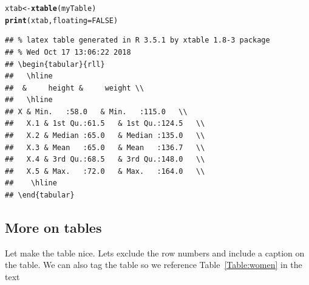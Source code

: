 \documentclass{article}\usepackage[]{graphicx}\usepackage[]{color}
\makeatletter
\newcommand{\hlnum}[1]{\textcolor[rgb]{0.686,0.059,0.569}{#1}}%
\newcommand{\hlstd}[1]{\textcolor[rgb]{0.345,0.345,0.345}{#1}}%
\newcommand{\hlkwb}[1]{\textcolor[rgb]{0.69,0.353,0.396}{#1}}%
\newcommand{\hlkwc}[1]{\textcolor[rgb]{0.333,0.667,0.333}{#1}}%
\newcommand{\hlkwd}[1]{\textcolor[rgb]{0.737,0.353,0.396}{\textbf{#1}}}%
\newenvironment{kframe}{%
 \def\at@end@of@kframe{}%
 \ifinner\ifhmode%
  \def\at@end@of@kframe{\end{minipage}}%
  \begin{minipage}{\columnwidth}%
 \fi\fi%
 \def\FrameCommand##1{\hskip\@totalleftmargin \hskip-\fboxsep
 \colorbox{shadecolor}{##1}\hskip-\fboxsep
     \hskip-\linewidth \hskip-\@totalleftmargin \hskip\columnwidth}%
 \MakeFramed {\advance\hsize-\width
   \@totalleftmargin\z@ \linewidth\hsize
   \@setminipage}}%
 {\par\unskip\endMakeFramed%
 \at@end@of@kframe}
\newenvironment{knitrout}{}{} %
\makeatother
\begin{document}
\begin{knitrout}
\color{fgcolor}\begin{kframe}
\begin{alltt}
\hlstd{xtab}\hlkwb{<-}\hlkwd{xtable}\hlstd{(myTable)}
\hlkwd{print}\hlstd{(xtab,} \hlkwc{floating}\hlstd{=}\hlnum{FALSE}\hlstd{)}
\end{alltt}
\begin{verbatim}
## % latex table generated in R 3.5.1 by xtable 1.8-3 package
## % Wed Oct 17 13:06:22 2018
## \begin{tabular}{rll}
##   \hline
##  &     height &     weight \\ 
##   \hline
## X & Min.   :58.0   & Min.   :115.0   \\ 
##   X.1 & 1st Qu.:61.5   & 1st Qu.:124.5   \\ 
##   X.2 & Median :65.0   & Median :135.0   \\ 
##   X.3 & Mean   :65.0   & Mean   :136.7   \\ 
##   X.4 & 3rd Qu.:68.5   & 3rd Qu.:148.0   \\ 
##   X.5 & Max.   :72.0   & Max.   :164.0   \\ 
##    \hline
## \end{tabular}
\end{verbatim}
\end{kframe}
\end{knitrout}


\subsection{More on tables}

Let make the table nice.  Lets exclude the row numbers and include a caption on the table. We can also tag the table so we reference Table~\ref{Table:women} in the text
\end{document}

